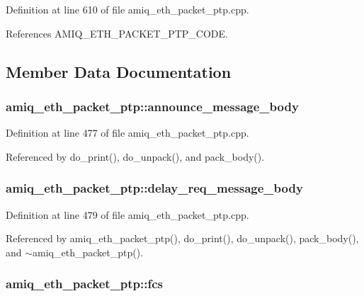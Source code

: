Definition at line 610 of file amiq\_\-eth\_\-packet\_\-ptp.cpp.

References AMIQ\_\-ETH\_\-PACKET\_\-PTP\_\-CODE.

\subsection{Member Data Documentation}
\hypertarget{classamiq__eth__packet__ptp_a6d3636995bf83da8721a245b27495e24}{
\subsubsection[{announce\_\-message\_\-body}]{ {\bf amiq\_\-eth\_\-packet\_\-ptp::announce\_\-message\_\-body}}}
\label{classamiq__eth__packet__ptp_a6d3636995bf83da8721a245b27495e24}


Definition at line 477 of file amiq\_\-eth\_\-packet\_\-ptp.cpp.

Referenced by do\_\-print(), do\_\-unpack(), and pack\_\-body().\hypertarget{classamiq__eth__packet__ptp_ad1117b52c9080df91e256d2649281547}{
\subsubsection[{delay\_\-req\_\-message\_\-body}]{ {\bf amiq\_\-eth\_\-packet\_\-ptp::delay\_\-req\_\-message\_\-body}}}
\label{classamiq__eth__packet__ptp_ad1117b52c9080df91e256d2649281547}


Definition at line 479 of file amiq\_\-eth\_\-packet\_\-ptp.cpp.

Referenced by amiq\_\-eth\_\-packet\_\-ptp(), do\_\-print(), do\_\-unpack(), pack\_\-body(), and $\sim$amiq\_\-eth\_\-packet\_\-ptp().\hypertarget{classamiq__eth__packet__ptp_a05a43b6fa83d4473878a59b44b8be088}{
\subsubsection[{fcs}]{ {\bf amiq\_\-eth\_\-packet\_\-ptp::fcs}}}
\label{classamiq__eth__packet__ptp_a05a43b6fa83d4473878a59b44b8be088}



